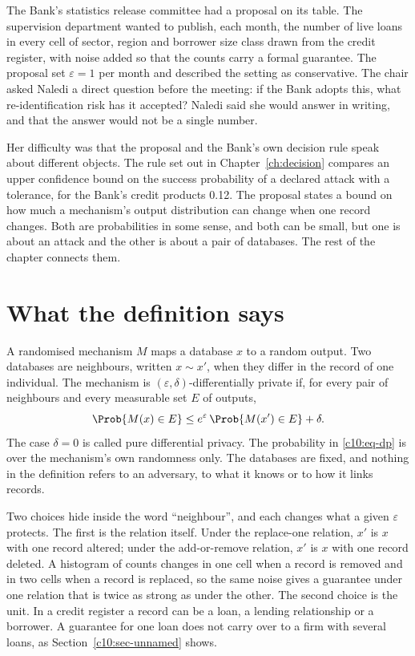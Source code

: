 The Bank's statistics release committee had a proposal on its table. The
supervision department wanted to publish, each month, the number of live loans in
every cell of sector, region and borrower size class drawn from the credit
register, with noise added so that the counts carry a formal guarantee. The
proposal set $\varepsilon = 1$ per month and described the setting as
conservative. The chair asked Naledi a direct question before the meeting: if the
Bank adopts this, what re-identification risk has it accepted? Naledi said she
would answer in writing, and that the answer would not be a single number.

Her difficulty was that the proposal and the Bank's own decision rule speak about
different objects. The rule set out in Chapter~\ref{ch:decision} compares an upper
confidence bound on the success probability of a declared attack with a
tolerance, for the Bank's credit products 0.12.
The proposal states a bound on how much a mechanism's output distribution can
change when one record changes. Both are probabilities in some sense, and both
can be small, but one is about an attack and the other is about a pair of
databases. The rest of the chapter connects them.

\section{What the definition says}

A randomised mechanism $M$ maps a database $x$ to a random output. Two databases
are neighbours, written $x \sim x'$, when they differ in the record of one
individual. The mechanism is $(\varepsilon,\delta)$-differentially private
\citep{dwork2006a,dwork2006b,dwork2014} if, for every pair of neighbours and every
measurable set $E$ of outputs,
\begin{equation}\label{c10:eq-dp}
\Prob\{M(x) \in E\} \le e^{\varepsilon}\,\Prob\{M(x') \in E\} + \delta .
\end{equation}
The case $\delta = 0$ is called pure differential privacy. The probability in
\eqref{c10:eq-dp} is over the mechanism's own randomness only. The databases are
fixed, and nothing in the definition refers to an adversary, to what it knows or
to how it links records.

Two choices hide inside the word ``neighbour'', and each changes what a given
$\varepsilon$ protects. The first is the relation itself. Under the replace-one
relation, $x'$ is $x$ with one record altered; under the add-or-remove relation,
$x'$ is $x$ with one record deleted. A histogram of counts changes in one cell
when a record is removed and in two cells when a record is replaced, so the same
noise gives a guarantee under one relation that is twice as strong as under the
other. The second choice is the unit. In a credit register a record can be a
loan, a lending relationship or a borrower. A guarantee for one loan does not
carry over to a firm with several loans, as Section~\ref{c10:sec-unnamed} shows.

